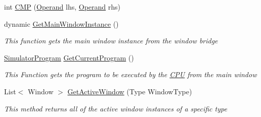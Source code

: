 \begin{DoxyCompactItemize}
\item 
int \hyperlink{class_c_p_u___o_s___simulator_1_1_c_p_u_1_1_instruction_a680092159bb5618a07049546887f1073}{C\+M\+P} (\hyperlink{class_c_p_u___o_s___simulator_1_1_c_p_u_1_1_operand}{Operand} lhs, \hyperlink{class_c_p_u___o_s___simulator_1_1_c_p_u_1_1_operand}{Operand} rhs)
\item 
dynamic \hyperlink{class_c_p_u___o_s___simulator_1_1_c_p_u_1_1_instruction_a6b21a943b331f1c15871302e1ba66882}{Get\+Main\+Window\+Instance} ()
\begin{DoxyCompactList}\small\item\em This function gets the main window instance from the window bridge \end{DoxyCompactList}\item 
\hyperlink{class_c_p_u___o_s___simulator_1_1_c_p_u_1_1_simulator_program}{Simulator\+Program} \hyperlink{class_c_p_u___o_s___simulator_1_1_c_p_u_1_1_instruction_a64441a8d85d6eef7e4c58794cfcdca3c}{Get\+Current\+Program} ()
\begin{DoxyCompactList}\small\item\em This Function gets the program to be executed by the \hyperlink{namespace_c_p_u___o_s___simulator_1_1_c_p_u}{C\+P\+U} from the main window \end{DoxyCompactList}\item 
List$<$ Window $>$ \hyperlink{class_c_p_u___o_s___simulator_1_1_c_p_u_1_1_instruction_a0db56b05531624fbe8d0075f4318cb50}{Get\+Active\+Window} (Type Window\+Type)
\begin{DoxyCompactList}\small\item\em This method returns all of the active window instances of a specific type \end{DoxyCompactList}\end{DoxyCompactItemize}
